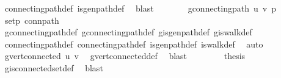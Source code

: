 \begin{isabellebody}
\ connecting{\isacharunderscore}{\kern0pt}path{\isacharunderscore}{\kern0pt}def\ is{\isacharunderscore}{\kern0pt}gen{\isacharunderscore}{\kern0pt}path{\isacharunderscore}{\kern0pt}def\ \isamarkupfalse%
\ blast\isanewline
\ \ \ \ \isamarkupfalse%
\ \isamarkupfalse%
\ {\isachardoublequoteopen}g{\isacharprime}{\kern0pt}{\isachardot}{\kern0pt}connecting{\isacharunderscore}{\kern0pt}path\ u\ v\ p{\isachardoublequoteclose}\isanewline
\ \ \ \ \ \ \isamarkupfalse%
\ set{\isacharunderscore}{\kern0pt}p\ conn{\isacharunderscore}{\kern0pt}path\isanewline
\ \ \ \ \ \ \isamarkupfalse%
\ g{\isacharprime}{\kern0pt}{\isachardot}{\kern0pt}connecting{\isacharunderscore}{\kern0pt}path{\isacharunderscore}{\kern0pt}def\ g{\isacharprime}{\kern0pt}{\isachardot}{\kern0pt}connecting{\isacharunderscore}{\kern0pt}path{\isacharunderscore}{\kern0pt}def\ g{\isacharprime}{\kern0pt}{\isachardot}{\kern0pt}is{\isacharunderscore}{\kern0pt}gen{\isacharunderscore}{\kern0pt}path{\isacharunderscore}{\kern0pt}def\ g{\isacharprime}{\kern0pt}{\isachardot}{\kern0pt}is{\isacharunderscore}{\kern0pt}walk{\isacharunderscore}{\kern0pt}def\isanewline
\ \ \ \ \ \ \isamarkupfalse%
\ connecting{\isacharunderscore}{\kern0pt}path{\isacharunderscore}{\kern0pt}def\ connecting{\isacharunderscore}{\kern0pt}path{\isacharunderscore}{\kern0pt}def\ is{\isacharunderscore}{\kern0pt}gen{\isacharunderscore}{\kern0pt}path{\isacharunderscore}{\kern0pt}def\ is{\isacharunderscore}{\kern0pt}walk{\isacharunderscore}{\kern0pt}def\ \isamarkupfalse%
\ auto\isanewline
\ \ \ \ \isamarkupfalse%
\ \isamarkupfalse%
\ {\isachardoublequoteopen}g{\isacharprime}{\kern0pt}{\isachardot}{\kern0pt}vert{\isacharunderscore}{\kern0pt}connected\ u\ v{\isachardoublequoteclose}\ \isamarkupfalse%
\ g{\isacharprime}{\kern0pt}{\isachardot}{\kern0pt}vert{\isacharunderscore}{\kern0pt}connected{\isacharunderscore}{\kern0pt}def\ \isamarkupfalse%
\ blast\isanewline
\ \ \isamarkupfalse%
\isanewline
\ \ \isamarkupfalse%
\ \isamarkupfalse%
\ {\isacharquery}{\kern0pt}thesis\ \isamarkupfalse%
\ g{\isacharprime}{\kern0pt}{\isachardot}{\kern0pt}is{\isacharunderscore}{\kern0pt}connected{\isacharunderscore}{\kern0pt}set{\isacharunderscore}{\kern0pt}def\ \isamarkupfalse%
\ blast\isanewline
{}\isamarkupfalse%
%
\endisatagproof
{\isafoldproof}%
%
\isadelimproof
\isanewline
%

\end{isabellebody}
